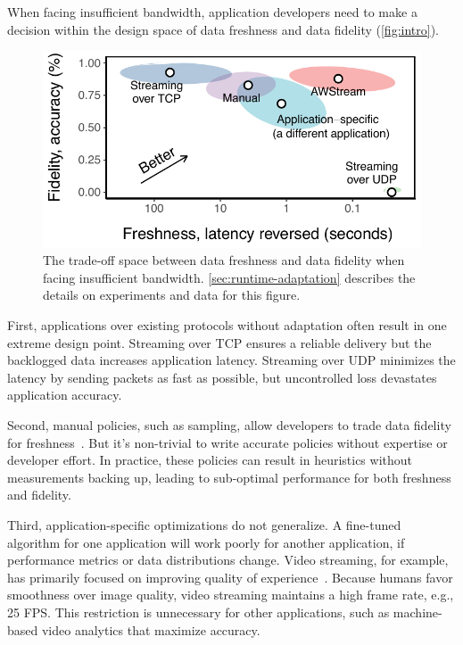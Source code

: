 When facing insufficient bandwidth, application developers need to make a
decision within the design space of data freshness and data fidelity
(\autoref{fig:intro}).

\begin{figure}
  \centering
  \includegraphics[width=0.9\columnwidth]{figures/figure1a.pdf}
  \caption{The trade-off space between data freshness and data fidelity when
    facing insufficient bandwidth. \autoref{sec:runtime-adaptation} describes
    the details on experiments and data for this figure.}
  \label{fig:intro}
  \vspace{-1em}
\end{figure}

First, applications over existing protocols without adaptation often result in one
extreme design point. Streaming over TCP ensures a reliable
delivery but the backlogged data increases application latency. Streaming over
UDP minimizes the latency by sending packets as fast as possible, but
uncontrolled loss devastates application accuracy.

Second, manual policies, such as sampling, allow developers to trade data
fidelity for freshness~\cite{rabkin2014aggregation}. But it's non-trivial to
write accurate policies without expertise or developer effort. In practice,
these policies can result in heuristics without measurements backing up, leading
to sub-optimal performance for both freshness and fidelity.

Third, application-specific optimizations do not generalize. A fine-tuned
algorithm for one application will work poorly for another application, if
performance metrics or data distributions change. Video streaming, for
example, has primarily focused on improving quality of
experience~\cite{yin2015control}. Because humans favor smoothness over image
quality, video streaming maintains a high frame rate, e.g., 25 FPS. This
restriction is unnecessary for other applications, such as machine-based video
analytics that maximize accuracy.

